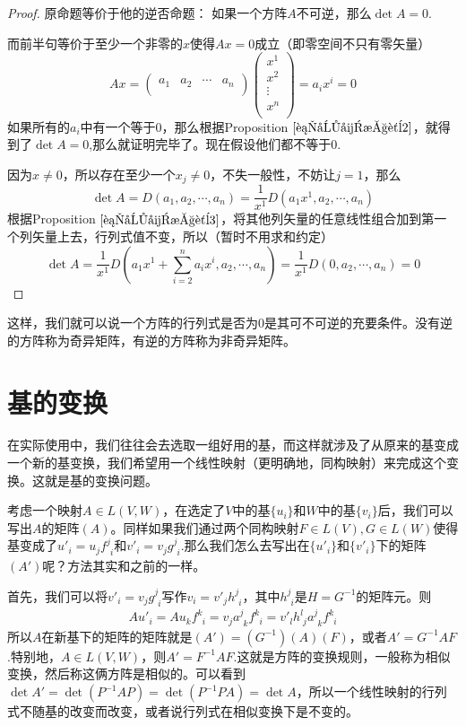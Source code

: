 \documentclass[11pt,a4paper,openany]{book}%
\theoremstyle{plain}%
\newcommand{\pref}[1]{{\rm Proposition} $\ref{#1}$}
\begin{document}
\begin{proof}原命题等价于他的逆否命题：
如果一个方阵$A$不可逆，那么$\det A=0$.

而前半句等价于至少一个非零的$x$使得$Ax=0$成立（即零空间不只有零矢量）
\[
Ax=\begin{pmatrix}
a_{1} & a_{2} & \cdots & a_{n}\\
\end{pmatrix}
\begin{pmatrix}
x^1\\
x^2\\
\vdots \\
x^n\\
\end{pmatrix}
=a_ix^i=0
\]
如果所有的$a_i$中有一个等于0，那么根据\pref{行列式性质2}，就得到了$\det A=0$,那么就证明完毕了。现在假设他们都不等于0.

因为$x\neq 0$，所以存在至少一个$x_j\neq0$，不失一般性，不妨让$j=1$，那么
\[
\det A=D(a_{1},a_{2},\cdots,a_{n})=\frac{1}{x^1}D(a_{1}x^1,a_{2},\cdots ,a_{n})
\]
根据\pref{行列式性质3}，将其他列矢量的任意线性组合加到第一个列矢量上去，行列式值不变，所以（暂时不用求和约定）
\[
\det A=\frac{1}{x^1}D\left(a_{1}x^1+\sum_{i=2}^n a_ix^i,a_{2},\cdots ,a_{n}\right)
=\frac{1}{x^1}D(0,a_{2},\cdots ,a_{n})=0
\]
\end{proof}

这样，我们就可以说一个方阵的行列式是否为0是其可不可逆的充要条件。没有逆的方阵称为{\kaishu 奇异矩阵}，有逆的方阵称为{\kaishu 非奇异矩阵}。
\section{基的变换}
在实际使用中，我们往往会去选取一组好用的基，而这样就涉及了从原来的基变成一个新的基变换，我们希望用一个线性映射（更明确地，同构映射）来完成这个变换。这就是基的变换问题。

考虑一个映射$A\in L(V,W)$，在选定了$V$中的基$\{u_i\}$和$W$中的基$\{v_i\}$后，我们可以写出$A$的矩阵$(A)$。同样如果我们通过两个同构映射$F \in L(V),G \in L(W)$使得基变成了$u'_i=u_jf_{\phantom{j}i}^j$和$v'_i=v_jg_{\phantom{j}i}^j$.那么我们怎么去写出在$\{u'_i\}$和$\{v'_i\}$下的矩阵$(A')$呢？方法其实和之前的一样。

首先，我们可以将$v'_i=v_jg_{\phantom{j}i}^j$写作$v_i=v'_jh_{\phantom{j}i}^j$，其中$h_{\phantom{j}i}^j$是$H=G^{-1}$的矩阵元。则
\[
Au'_i=Au_kf_{\phantom{k}i}^k=v_ja_{\phantom{j}k}^{j} f_{\phantom {k}i}^k=v'_{l}h_{\phantom{l}j}^{l} a_{\phantom{j} k}^{j} f_{\phantom{k} i}^{k}
\]
所以$A$在新基下的矩阵的矩阵就是$(A')=(G^{-1})(A)(F)$，或者$A'=G^{-1}AF$.特别地，$A\in L(V,W)$，则$A'=F^{-1}AF$.这就是方阵的变换规则，一般称为{\kaishu 相似变换}，然后称这俩方阵是{\kaishu 相似}的。可以看到$\det A'=\det (P^{-1}AP)=\det (P^{-1}PA)=\det A$，所以一个线性映射的行列式不随基的改变而改变，或者说行列式在相似变换下是不变的。
\end{document}
